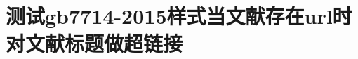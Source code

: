 \documentclass[twoside]{article}
\begin{document}
    \section{测试gb7714-2015样式当文献存在url时对文献标题做超链接}

	\nocite{*}

    \printbibliography

    
\end{document}
